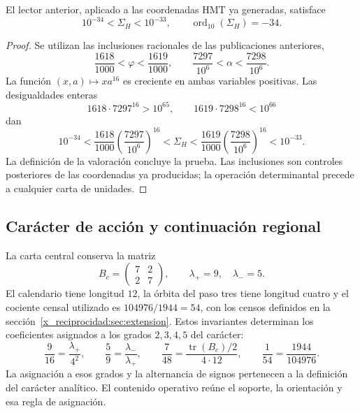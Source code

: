 \begin{theorem}
\label{x_reciprocidad:iv:action:decada}
El lector anterior, aplicado a las coordenadas HMT ya generadas,
satisface
\begin{equation}
 10^{-34}<\Sigma_H<10^{-33},
 \qquad \operatorname{ord}_{10}(\Sigma_H)=-34.
 \label{x_reciprocidad:iv:action:orden-decimal}
\end{equation}
\end{theorem}
\begin{proof}
Se utilizan las inclusiones racionales de las publicaciones
anteriores,
\begin{equation}
 \frac{1618}{1000}<\varphi<\frac{1619}{1000},
 \qquad
 \frac{7297}{10^6}<\alpha<\frac{7298}{10^6}.
 \label{x_reciprocidad:iv:action:intervalos}
\end{equation}
La función \((x,a)\mapsto xa^{16}\) es creciente en ambas
variables positivas. Las desigualdades enteras
\[
 1618\cdot7297^{16}>10^{65},
 \qquad 1619\cdot7298^{16}<10^{66}
\]
dan
\[
 10^{-34}
 <\frac{1618}{1000}\left(\frac{7297}{10^6}\right)^{16}
 <\Sigma_H
 <\frac{1619}{1000}\left(\frac{7298}{10^6}\right)^{16}
 <10^{-33}.
\]
La definición de la valoración concluye la prueba. Las inclusiones
son controles posteriores de las coordenadas ya producidas; la
operación determinantal precede a cualquier carta de unidades.
\end{proof}

\subsection{Carácter de acción y continuación regional}
\label{x_reciprocidad:iv:action:caracter}

La carta central conserva la matriz
\[
 B_c=\begin{pmatrix}7&2\\2&7\end{pmatrix},
 \qquad\lambda_+=9,\quad\lambda_-=5.
\]
El calendario tiene longitud \(12\), la órbita del paso tres tiene
longitud cuatro y el cociente censal utilizado es
\(104976/1944=54\), con los censos definidos en la
sección~\ref{x_reciprocidad:sec:extension}. Estos invariantes determinan los coeficientes
asignados a los grados \(2,3,4,5\) del carácter:
\begin{equation}
 \frac9{16}=\frac{\lambda_+}{4^2},\qquad
 \frac59=\frac{\lambda_-}{\lambda_+},\qquad
 \frac7{48}=\frac{\operatorname{tr}(B_c)/2}{4\cdot12},
 \qquad
 \frac1{54}=\frac{1944}{104976}.
 \label{x_reciprocidad:iv:action:coeficientes}
\end{equation}
La asignación a esos grados y la alternancia de signos pertenecen
a la definición del carácter analítico. El contenido operativo
reúne el soporte, la orientación y esa regla de asignación.

